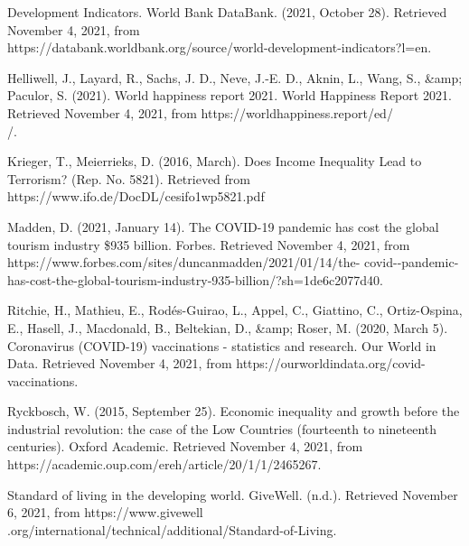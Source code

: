 \documentclass[fontsize=11pt]{article}
\begin{document}
    \item Development Indicators. World Bank DataBank. (2021, October 28). Retrieved November 4, 2021, from \\ \indent https://databank.worldbank.org/source/world-development-indicators?l=en. \\

    \item Helliwell, J., Layard, R., Sachs, J. D., Neve, J.-E. D., Aknin, L., Wang, S., &amp; Paculor, S. (2021). World happiness \indent report 2021. World Happiness Report 2021. Retrieved November 4, 2021, from https://worldhappiness.report/ed/\\ /.\\

    \item Krieger, T.,  Meierrieks, D. (2016, March).  Does Income Inequality Lead to Terrorism?  (Rep.  No.  5821). Retrieved \indent from https://www.ifo.de/DocDL/cesifo1wp5821.pdf \\

    \item Madden, D. (2021, January 14). The COVID-19 pandemic has cost the global tourism industry \$935 billion. \indent Forbes. Retrieved November 4, 2021, from https://www.forbes.com/sites/duncanmadden/2021/01/14/the- covid--pandemic-has-cost-the-global-tourism-industry-935-billion/?sh=1de6c2077d40. \\

    \item Ritchie, H., Mathieu, E., Rodés-Guirao, L., Appel, C., Giattino, C., Ortiz-Ospina, E., Hasell, J., Macdonald, B., \indent Beltekian, D., &amp; Roser, M. (2020, March 5). Coronavirus (COVID-19) vaccinations - statistics and research. \indent Our World in Data. Retrieved November 4, 2021, from https://ourworldindata.org/covid-vaccinations. \\

    \item Ryckbosch, W. (2015, September 25). Economic inequality and growth before the industrial revolution: the case \indent of the Low Countries (fourteenth to nineteenth centuries). Oxford Academic. Retrieved November 4, 2021, from \indent https://academic.oup.com/ereh/article/20/1/1/2465267. \\

    \item Standard of living in the developing world. GiveWell. (n.d.). Retrieved November 6, 2021, from https://www.givewell\\ \indent .org/international/technical/additional/Standard-of-Living. \\
\end{document}
